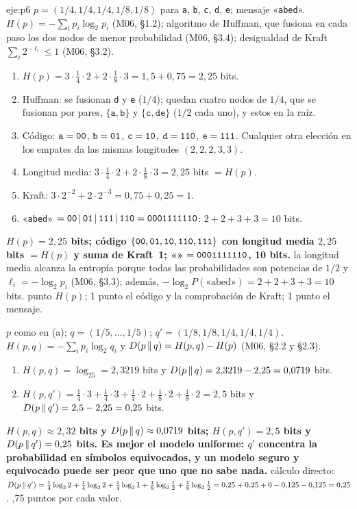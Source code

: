 \begin{solucion}{eje:p6}
\datos $p=(1/4,1/4,1/4,1/8,1/8)$ para \texttt a, \texttt b, \texttt c, \texttt d, \texttt e; mensaje «\texttt{abed}».
\planteamiento $H(p)=-\sum_ip_i\log_2p_i$ (M06, §1.2); algoritmo de Huffman, que fusiona en cada paso los dos nodos de menor probabilidad (M06, §3.4); desigualdad de Kraft $\sum_i2^{-\ell_i}\le1$ (M06, §3.2).
\pasos
\begin{enumerate}[label=\arabic*.]
  \item $H(p)=3\cdot\tfrac14\cdot2+2\cdot\tfrac18\cdot3=1{,}5+0{,}75=2{,}25$ bits.
  \item Huffman: se fusionan \texttt d y \texttt e ($1/4$); quedan cuatro nodos de $1/4$, que se fusionan por pares, $\{\texttt a,\texttt b\}$ y $\{\texttt c,\texttt{de}\}$ ($1/2$ cada uno), y estos en la raíz.
  \item Código: $\texttt a=\textnormal{\texttt{00}}$, $\texttt b=\textnormal{\texttt{01}}$, $\texttt c=\textnormal{\texttt{10}}$, $\texttt d=\textnormal{\texttt{110}}$, $\texttt e=\textnormal{\texttt{111}}$. Cualquier otra elección en los empates da las mismas longitudes $(2,2,2,3,3)$.
  \item Longitud media: $3\cdot\tfrac14\cdot2+2\cdot\tfrac18\cdot3=2{,}25$ bits $=H(p)$.
  \item Kraft: $3\cdot2^{-2}+2\cdot2^{-3}=0{,}75+0{,}25=1$.
  \item «\texttt{abed}» $=\textnormal{\texttt{00}}\,|\,\textnormal{\texttt{01}}\,|\,\textnormal{\texttt{111}}\,|\,\textnormal{\texttt{110}}=\textnormal{\texttt{0001111110}}$: $2+2+3+3=10$ bits.
\end{enumerate}
\resultado \textbf{$H(p)=2{,}25$ bits; código $\{\textnormal{\texttt{00}},\textnormal{\texttt{01}},\textnormal{\texttt{10}},\textnormal{\texttt{110}},\textnormal{\texttt{111}}\}$ con longitud media $2{,}25$ bits $=H(p)$ y suma de Kraft~1; «» $=\textnormal{\texttt{0001111110}}$, 10 bits.}
\comprobacion la longitud media alcanza la entropía porque todas las probabilidades son potencias de $1/2$ y $\ell_i=-\log_2p_i$ (M06, §3.3); además, $-\log_2P(\text{«abed»})=2+2+3+3=10$ bits.
 punto $H(p)$; 1 punto el código y la comprobación de Kraft; 1 punto el mensaje.

\datos $p$ como en (a); $q=(1/5,\dots,1/5)$; $q'=(1/8,1/8,1/4,1/4,1/4)$.
\planteamiento $H(p,q)=-\sum_ip_i\log_2q_i$ y $D(p\,\|\,q)=H(p,q)-H(p)$ (M06, §2.2 y §2.3).
\pasos
\begin{enumerate}[label=\arabic*.]
  \item $H(p,q)=\log_25=2{,}3219$ bits y $D(p\,\|\,q)=2{,}3219-2{,}25=0{,}0719$ bits.
  \item $H(p,q')=\tfrac14\cdot3+\tfrac14\cdot3+\tfrac14\cdot2+\tfrac18\cdot2+\tfrac18\cdot2=2{,}5$ bits y $D(p\,\|\,q')=2{,}5-2{,}25=0{,}25$ bits.
\end{enumerate}
\resultado \textbf{$H(p,q)\approx2{,}32$ bits y $D(p\,\|\,q)\approx0{,}0719$ bits; $H(p,q')=2{,}5$ bits y $D(p\,\|\,q')=0{,}25$ bits. Es mejor el modelo uniforme: $q'$ concentra la probabilidad en símbolos equivocados, y un modelo seguro y equivocado puede ser peor que uno que no sabe nada.}
\comprobacion cálculo directo: $D(p\,\|\,q')=\tfrac14\log_22+\tfrac14\log_22+\tfrac14\log_21+\tfrac18\log_2\tfrac12+\tfrac18\log_2\tfrac12=0{,}25+0{,}25+0-0{,}125-0{,}125=0{,}25$.
,75 puntos por cada valor.


\end{solucion}
